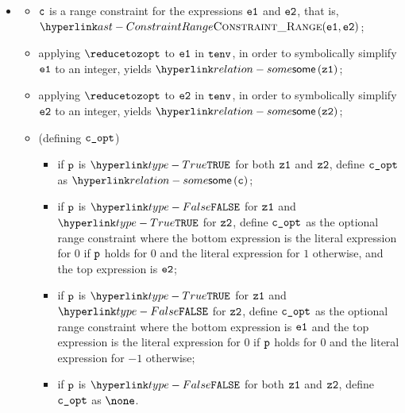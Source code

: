 \begin{itemize}
  \item {}
  \begin{itemize}
    \item $\texttt{c}$ is a range constraint for the expressions $\texttt{e1}$ and $\texttt{e2}$, that is, \\
          $\ConstraintRange(\veone, \vetwo)$;
    \item applying $\reducetozopt$ to $\texttt{e1}$ in $\texttt{tenv}$, in order to symbolically simplify $\texttt{e1}$ to an integer,
          yields $\some{\vzone}$;
    \item applying $\reducetozopt$ to $\texttt{e2}$ in $\texttt{tenv}$, in order to symbolically simplify $\texttt{e2}$ to an integer,
          yields $\some{\vztwo}$;
    \item \OneApplies{} (defining $\texttt{c\_opt}$)
    \begin{itemize}
      \item if $\texttt{p}$ is $\True$ for both $\texttt{z1}$ and $\texttt{z2}$, define $\texttt{c\_opt}$ as $\some{\vc}$;
      \item if $\texttt{p}$ is $\False$ for $\texttt{z1}$ and $\True$ for $\texttt{z2}$, define $\texttt{c\_opt}$ as the optional range constraint
            where the bottom expression is the literal expression for $0$ if $\texttt{p}$ holds for $0$ and the literal expression for $1$ otherwise,
            and the top expression is $\texttt{e2}$;
      \item if $\texttt{p}$ is $\True$ for $\texttt{z1}$ and $\False$ for $\texttt{z2}$, define $\texttt{c\_opt}$ as the optional range constraint
            where the bottom expression is $\texttt{e1}$ and the top expression is the literal expression for $0$ if $\texttt{p}$ holds for $0$
            and the literal expression for $-1$ otherwise;
      \item if $\texttt{p}$ is $\False$ for both $\texttt{z1}$ and $\texttt{z2}$, define $\texttt{c\_opt}$ as $\none$.
    \end{itemize}
  \end{itemize}


\end{itemize}
